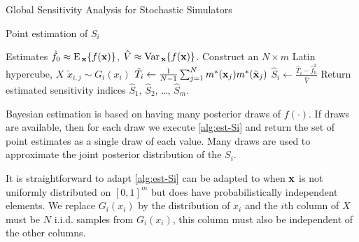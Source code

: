 \begin{chapter}{Global Sensitivity Analysis for Stochastic Simulators\label{Ch:sensitivity}}
\begin{algorithm}[h]
\caption{Point estimation of $S_i$}\label{alg:est-Si}
\begin{algorithmic}
\Require Estimates $\hat{f}_0 \approx \textrm{E}\,_{\mathbf{x}} \{ f(\mathbf{x}) \} $, $\hat{V} \approx \mathrm{Var}\,_{\mathbf{x}} \{ f(\mathbf{x}) \}$.
  \State Construct an $N \times m$  Latin hypercube, $X$
  \State {}
  \State $\tilde{x}_{i,j} \sim G_i(x_i)$ 
  \EndFor
  \State $\hat{T}_i \gets \frac{1}{N-1}\sum_{j=1}^N m^{*}(\mathbf{x}_j)m^{*}(\tilde{\mathbf{x}}_j)$
  \State $\hat{S}_i \gets \frac{\hat{T}_i - \hat{f}^2_0}{\hat{V}}$
\EndFor
\State Return estimated sensitivity indices $\hat{S}_1$, $\hat{S}_2$, \ldots, $\hat{S}_m$.
\end{algorithmic}
\end{algorithm}
Bayesian estimation is based on having many posterior draws of $f(\cdot)$. If draws are available, then for each draw we execute \cref{alg:est-Si} and return the set of point estimates as a single draw of each value. Many draws are used to approximate the joint posterior distribution of the $S_i$.

It is straightforward to adapt \cref{alg:est-Si} can be adapted to when $\mathbf{x}$ is not uniformly distributed on $[0,1]^m$ but does have probabilistically independent elements. We replace $G_i(x_i)$ by the distribution of $x_i$ and the $i$th column of $X$ must be $N$ i.i.d. samples from $G_i(x_i)$, this column must also be independent of the other columns.



\end{chapter}
